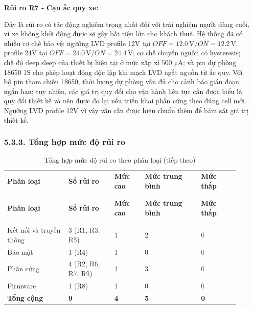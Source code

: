 \documentclass[a4paper]{extarticle}
\newcommand{\thesissettableid}[2]{%
  \renewcommand{\thetable}{#1}%
  \renewcommand{\theHtable}{#2}%
}
\begin{document}
\textbf{Rủi ro R7 - Cạn ắc quy xe:}

Đây là rủi ro có tác động nghiêm trọng nhất đối với trải nghiệm người
dùng cuối, vì xe không khởi động được sẽ gây bất tiện lớn cho khách
thuê. Hệ thống đã có nhiều cơ chế bảo vệ: ngưỡng LVD profile 12V tại
\(OFF = 12.0\,\mathrm{V}\)/\(ON = 12.2\,\mathrm{V}\), profile 24V tại
\(OFF = 24.0\,\mathrm{V}\)/\(ON = 24.4\,\mathrm{V}\); cơ chế chuyển
nguồn có hysteresis; chế độ deep sleep của thiết bị hiện tại ở mức xấp
xỉ 500 μA; và pin dự phòng 18650 1S cho phép hoạt động độc lập khi mạch
LVD ngắt nguồn từ ắc quy. Với bộ pin tham chiếu 18650, thời lượng dự
phòng vẫn đủ cho cảnh báo gián đoạn ngắn hạn; tuy nhiên, các giá trị
quy đổi cho vận hành liên tục cần được hiểu là quy đổi thiết kế và nên
được đo lại nếu triển khai phần cứng theo đúng cell mới. Ngưỡng LVD
profile 12V vì vậy vẫn cần được hiệu chuẩn thêm để bám sát giá trị thiết
kế.

\subsubsection{5.3.3. Tổng hợp mức độ rủi
ro}\label{533-tux1ed5ng-hux1ee3p-mux1ee9c-ux111ux1ed9-rux1ee7i-ro}


{\thesissettableid{5.9}{tab-ch5-tong-hop-muc-o-rui-ro-theo-phan-loai}
\def\LTcaptype{table}
\begin{longtable}{|L{0.249\linewidth}|L{0.189\linewidth}|L{0.125\linewidth}|L{0.229\linewidth}|L{0.153\linewidth}|}
\caption{Tổng hợp mức độ rủi ro theo phân loại}\label{tab:ch5-tong-hop-muc-o-rui-ro-theo-phan-loai}\\
\hline \textbf{Phân loại} & \textbf{Số rủi ro} & \textbf{Mức cao} & \textbf{Mức trung bình} & \textbf{Mức thấp} \\
\\\hline
\endfirsthead
\caption[]{Tổng hợp mức độ rủi ro theo phân loại (tiếp theo)}\\
\hline \textbf{Phân loại} & \textbf{Số rủi ro} & \textbf{Mức cao} & \textbf{Mức trung bình} & \textbf{Mức thấp} \\
\\\hline
\endhead
\\\hline
\endfoot
\endlastfoot
Kết nối và truyền thông & 3 (R1, R3, R5) & 1 & 2 & 0 \\\hline
Bảo mật & 1 (R4) & 1 & 0 & 0 \\\hline
Phần cứng & 4 (R2, R6, R7, R9) & 1 & 3 & 0 \\\hline
Firmware & 1 (R8) & 1 & 0 & 0 \\\hline
\textbf{Tổng cộng} & \textbf{9} & \textbf{4} & \textbf{5} &
\textbf{0} \\\hline
\end{longtable}
}
\end{document}
